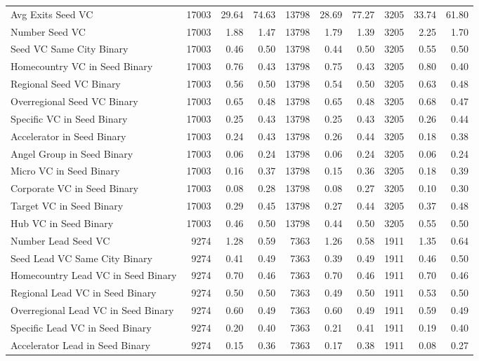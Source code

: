 \begin{table}[!h]
{\begin{tabular}[t]{lrrrrrrrrr}
Avg Exits Seed VC & 17003 & 29.64 & 74.63 & 13798 & 28.69 & 77.27 & 3205 & 33.74 & 61.80\\
Number Seed VC & 17003 & 1.88 & 1.47 & 13798 & 1.79 & 1.39 & 3205 & 2.25 & 1.70\\
Seed VC Same City Binary & 17003 & 0.46 & 0.50 & 13798 & 0.44 & 0.50 & 3205 & 0.55 & 0.50\\
Homecountry VC in Seed Binary & 17003 & 0.76 & 0.43 & 13798 & 0.75 & 0.43 & 3205 & 0.80 & 0.40\\
\addlinespace
Regional Seed VC Binary & 17003 & 0.56 & 0.50 & 13798 & 0.54 & 0.50 & 3205 & 0.63 & 0.48\\
Overregional Seed VC Binary & 17003 & 0.65 & 0.48 & 13798 & 0.65 & 0.48 & 3205 & 0.68 & 0.47\\
Specific VC in Seed Binary & 17003 & 0.25 & 0.43 & 13798 & 0.25 & 0.43 & 3205 & 0.26 & 0.44\\
Accelerator in Seed Binary & 17003 & 0.24 & 0.43 & 13798 & 0.26 & 0.44 & 3205 & 0.18 & 0.38\\
Angel Group in Seed Binary & 17003 & 0.06 & 0.24 & 13798 & 0.06 & 0.24 & 3205 & 0.06 & 0.24\\
\addlinespace
Micro VC in Seed Binary & 17003 & 0.16 & 0.37 & 13798 & 0.15 & 0.36 & 3205 & 0.18 & 0.39\\
Corporate VC in Seed Binary & 17003 & 0.08 & 0.28 & 13798 & 0.08 & 0.27 & 3205 & 0.10 & 0.30\\
Target VC in Seed Binary & 17003 & 0.29 & 0.45 & 13798 & 0.27 & 0.44 & 3205 & 0.37 & 0.48\\
Hub VC in Seed Binary & 17003 & 0.46 & 0.50 & 13798 & 0.44 & 0.50 & 3205 & 0.55 & 0.50\\
Number Lead Seed VC & 9274 & 1.28 & 0.59 & 7363 & 1.26 & 0.58 & 1911 & 1.35 & 0.64\\
\addlinespace
Seed Lead VC Same City Binary & 9274 & 0.41 & 0.49 & 7363 & 0.39 & 0.49 & 1911 & 0.46 & 0.50\\
Homecountry Lead VC in Seed Binary & 9274 & 0.70 & 0.46 & 7363 & 0.70 & 0.46 & 1911 & 0.70 & 0.46\\
Regional Lead VC in Seed Binary & 9274 & 0.50 & 0.50 & 7363 & 0.49 & 0.50 & 1911 & 0.53 & 0.50\\
Overregional Lead VC in Seed Binary & 9274 & 0.60 & 0.49 & 7363 & 0.60 & 0.49 & 1911 & 0.59 & 0.49\\
Specific Lead VC in Seed Binary & 9274 & 0.20 & 0.40 & 7363 & 0.21 & 0.41 & 1911 & 0.19 & 0.40\\
\addlinespace
Accelerator Lead in Seed Binary & 9274 & 0.15 & 0.36 & 7363 & 0.17 & 0.38 & 1911 & 0.08 & 0.27\\

\end{tabular}}
\end{table}
